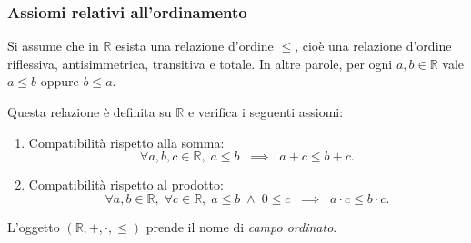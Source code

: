 \documentclass[oneside,10pt]{book} %
\begin{document}

\subsubsection{Assiomi relativi all'ordinamento}
Si assume che in $\mathbb{R}$ esista una relazione d’ordine $\leq$, cioè una relazione d’ordine riflessiva, antisimmetrica, transitiva e totale.
In altre parole, per ogni $a,b \in \mathbb{R}$ vale $a \leq b$ oppure $b \leq a$.

Questa relazione è definita su $\mathbb{R}$ e verifica i seguenti assiomi:

\begin{enumerate}
  \renewcommand{\labelenumi}{b\theenumi}

  \item Compatibilità rispetto alla somma:
  \[
    \forall a,b,c \in \mathbb{R}, \; a \leq b \;\;\implies\;\; a+c \leq b+c.
  \]

  \item Compatibilità rispetto al prodotto:
  \[
    \forall a,b \in \mathbb{R}, \; \forall c \in \mathbb{R}, \;
    a \leq b \;\wedge\; 0 \leq c \;\;\implies\;\; a \cdot c \leq b \cdot c.
  \]
\end{enumerate}

L'oggetto $(\mathbb{R}, +, \cdot, \leq)$ prende il nome di \emph{campo ordinato}.
\end{document}
